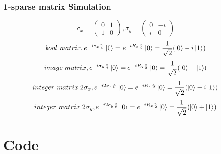 \documentclass{article}
\begin{document}
\subsubsection{1-sparse matrix Simulation}
$$ \sigma_x =\left(\begin{matrix}
	0 & 1 \\
	1& 0
	\end{matrix}\right),
	\sigma_y = \left(\begin{matrix}
	0 & -i \\
	i & 0 
	\end{matrix}\right)
	$$
	$$ bool\  matrix, e^{-i\sigma_x \frac{\pi}{4} }\ket{0}=e^{-iR_x \frac{\pi}{2} }\ket{0} = \frac{1}{\sqrt{2}}(\ket{0}-i\ket{1}) $$
	$$ image \  matrix, e^{-i\sigma_y \frac{\pi}{4} }\ket{0}=e^{-iR_y \frac{\pi}{2} }\ket{0} = \frac{1}{\sqrt{2}}(\ket{0}+\ket{1}) $$	
	$$ integer\ matrix\  2\sigma_x, e^{-i2\sigma_x \frac{\pi}{8} }\ket{0}=e^{-iR_x \frac{\pi}{2} }\ket{0} = \frac{1}{\sqrt{2}}(\ket{0}-i\ket{1}) $$
	$$ integer\ matrix\  2\sigma_y, e^{-i2\sigma_y \frac{\pi}{8} }\ket{0}=e^{-iR_x \frac{\pi}{2} }\ket{0} = \frac{1}{\sqrt{2}}(\ket{0}+\ket{1}) $$
\section{Code}
\end{document}
